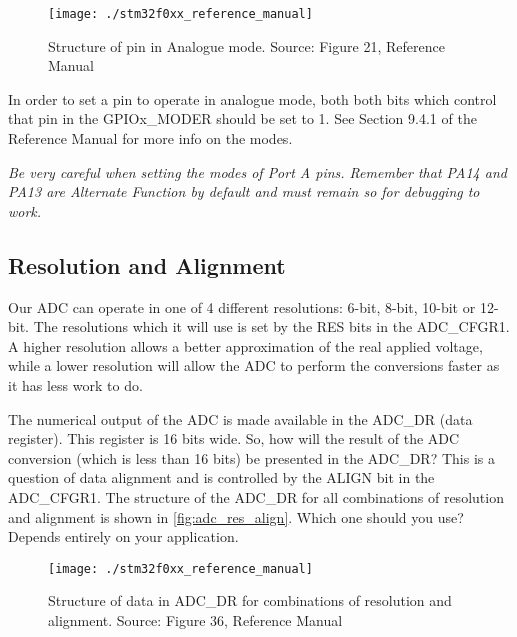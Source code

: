 \begin{figure}
\centering
\texttt{[image: ./stm32f0xx\_reference\_manual]}
\caption{Structure of pin in Analogue mode. Source: Figure 21, Reference Manual}
\label{fig:pin_analogue_mode}
\end{figure}

In order to set a pin to operate in analogue mode, both both bits which control that pin in the GPIOx\_MODER should be set to 1. See Section 9.4.1 of the Reference Manual for more info on the modes. 

\emph{Be very careful when setting the modes of Port A pins. Remember that PA14 and PA13 are Alternate Function by default and must remain so for debugging to work.}


\subsection{Resolution and Alignment}
Our ADC can operate in one of 4 different resolutions: 6-bit, 8-bit, 10-bit or 12-bit. The resolutions which it will use is set by the RES bits in the ADC\_CFGR1. A higher resolution allows a better approximation of the real applied voltage, while a lower resolution will allow the ADC to perform the conversions faster as it has less work to do.

The numerical output of the ADC is made available in the ADC\_DR (data register). This register is 16 bits wide. So, how will the result of the ADC conversion (which is less than 16 bits) be presented in the ADC\_DR? This is a question of data alignment and is controlled by the ALIGN bit in the ADC\_CFGR1. The structure of the ADC\_DR for all combinations of resolution and alignment is shown in \autoref{fig:adc_res_align}. Which one should you use? Depends entirely on your application. 

\begin{figure}
\centering
\texttt{[image: ./stm32f0xx\_reference\_manual]}
\caption{Structure of data in ADC\_DR for combinations of resolution and alignment. Source: Figure 36, Reference Manual}
\label{fig:adc_res_align}
\end{figure}

